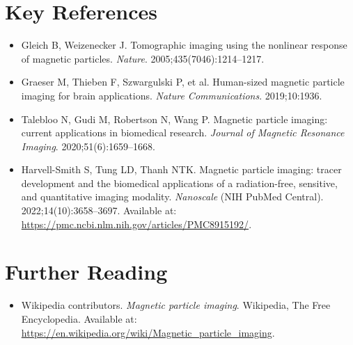 \section{Key References}
\begin{itemize}
  \item Gleich B, Weizenecker J. Tomographic imaging using the nonlinear response of magnetic particles. \textit{Nature}. 2005;435(7046):1214--1217.
  \item Graeser M, Thieben F, Szwargulski P, et al. Human-sized magnetic particle imaging for brain applications. \textit{Nature Communications}. 2019;10:1936.
  \item Talebloo N, Gudi M, Robertson N, Wang P. Magnetic particle imaging: current applications in biomedical research. \textit{Journal of Magnetic Resonance Imaging}. 2020;51(6):1659--1668.
  \item Harvell-Smith S, Tung LD, Thanh NTK. Magnetic particle imaging: tracer development and the biomedical applications of a radiation-free, sensitive, and quantitative imaging modality. \textit{Nanoscale} (NIH PubMed Central). 2022;14(10):3658--3697. Available at: \url{https://pmc.ncbi.nlm.nih.gov/articles/PMC8915192/}.
\end{itemize}

\section{Further Reading}
\begin{itemize}
  \item Wikipedia contributors. \textit{Magnetic particle imaging}. Wikipedia, The Free Encyclopedia. Available at: \url{https://en.wikipedia.org/wiki/Magnetic_particle_imaging}.
\end{itemize}

